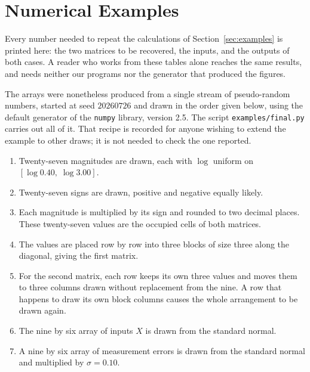 \appendix
\setcounter{section}{0}
\renewcommand{\thesection}{\Alph{section}}

\pagebreak{}


\section{Numerical Examples}
\label{app:numbers}

Every number needed to repeat the calculations of Section~\ref{sec:examples} is
printed here: the two matrices to be recovered, the inputs, and the outputs of both
cases. A reader who works from these tables alone reaches the same results, and
needs neither our programs nor the generator that produced the figures.

The arrays were nonetheless produced from a single stream of pseudo-random numbers,
started at seed $20260726$ and drawn in the order given below, using the default
generator of the \texttt{numpy} library, version 2.5. The script
\texttt{examples/final.py} carries out all of it. That recipe is recorded for anyone
wishing to extend the example to other draws; it is not needed to check the one
reported.

\begin{enumerate}
\item Twenty-seven magnitudes are drawn, each with $\log$ uniform on
      $[\log 0.40,\; \log 3.00]$.
\item Twenty-seven signs are drawn, positive and negative equally likely.
\item Each magnitude is multiplied by its sign and rounded to two decimal places.
      These twenty-seven values are the occupied cells of both matrices.
\item The values are placed row by row into three blocks of size three along the
      diagonal, giving the first matrix.
\item For the second matrix, each row keeps its own three values and moves them to
      three columns drawn without replacement from the nine. A row that happens to
      draw its own block columns causes the whole arrangement to be drawn again.
\item The nine by six array of inputs $X$ is drawn from the standard normal.
\item A nine by six array of measurement errors is drawn from the standard normal
      and multiplied by $\sigma = 0.10$.
\end{enumerate}

